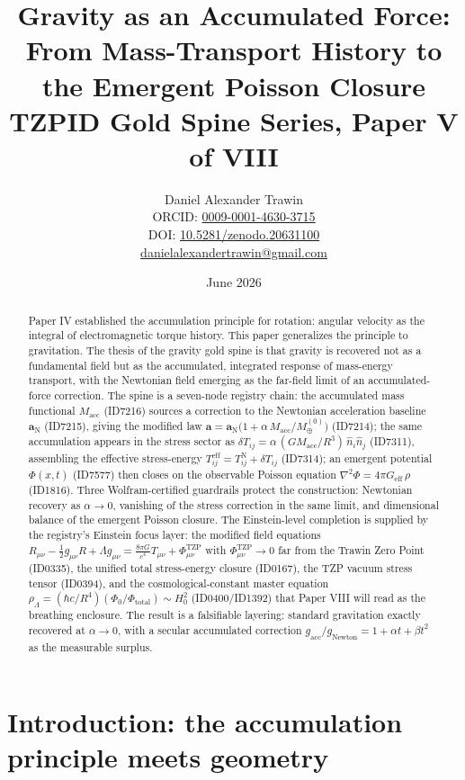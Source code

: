 \documentclass[11pt]{article}
\title{Gravity as an Accumulated Force: From Mass-Transport History to the Emergent Poisson Closure\\[0.6em]
\large TZPID Gold Spine Series, Paper V of VIII}
\author{Daniel Alexander Trawin\\
\small ORCID: \href{https://orcid.org/0009-0001-4630-3715}{0009-0001-4630-3715}\\
\small DOI: \href{https://doi.org/10.5281/zenodo.20631100}{10.5281/zenodo.20631100}\\
\small \href{mailto:danielalexandertrawin@gmail.com}{danielalexandertrawin@gmail.com}}
\date{June 2026}
\theoremstyle{remark}
\begin{document}
\maketitle

\begin{abstract}
Paper IV established the accumulation principle for rotation: angular velocity as the integral of electromagnetic torque history. This paper generalizes the principle to gravitation. The thesis of the gravity gold spine is that gravity is recovered not as a fundamental field but as the accumulated, integrated response of mass-energy transport, with the Newtonian field emerging as the far-field limit of an accumulated-force correction. The spine is a seven-node registry chain: the accumulated mass functional $M_{\mathrm{acc}}$ (ID7216) sources a correction to the Newtonian acceleration baseline $\mathbf{a}_{\mathrm{N}}$ (ID7215), giving the modified law $\mathbf{a} = \mathbf{a}_{\mathrm{N}}\big(1 + \alpha\, M_{\mathrm{acc}}/M_\oplus^{(0)}\big)$ (ID7214); the same accumulation appears in the stress sector as $\delta T_{ij} = \alpha\, (G M_{\mathrm{acc}}/R^3)\, \hat{n}_i \hat{n}_j$ (ID7311), assembling the effective stress-energy $T^{\mathrm{eff}}_{ij} = T^{\mathrm{N}}_{ij} + \delta T_{ij}$ (ID7314); an emergent potential $\Phi(x,t)$ (ID7577) then closes on the observable Poisson equation $\nabla^2\Phi = 4\pi G_{\mathrm{eff}}\,\rho$ (ID1816). Three Wolfram-certified guardrails protect the construction: Newtonian recovery as $\alpha \to 0$, vanishing of the stress correction in the same limit, and dimensional balance of the emergent Poisson closure. The Einstein-level completion is supplied by the registry's Einstein focus layer: the modified field equations $R_{\mu\nu} - \frac{1}{2}g_{\mu\nu}R + \Lambda g_{\mu\nu} = \frac{8\pi G}{c^4}T_{\mu\nu} + \Phi^{\mathrm{TZP}}_{\mu\nu}$ with $\Phi^{\mathrm{TZP}}_{\mu\nu} \to 0$ far from the Trawin Zero Point (ID0335), the unified total stress-energy closure (ID0167), the TZP vacuum stress tensor (ID0394), and the cosmological-constant master equation $\rho_\Lambda = (\hbar c/R^4)(\Phi_0/\Phi_{\mathrm{total}}) \sim H_0^2$ (ID0400/ID1392) that Paper VIII will read as the breathing enclosure. The result is a falsifiable layering: standard gravitation exactly recovered at $\alpha \to 0$, with a secular accumulated correction $g_{\mathrm{acc}}/g_{\mathrm{Newton}} = 1 + \alpha t + \beta t^2$ as the measurable surplus.
\end{abstract}

\section{Introduction: the accumulation principle meets geometry}
\label{sec:intro}
\end{document}

